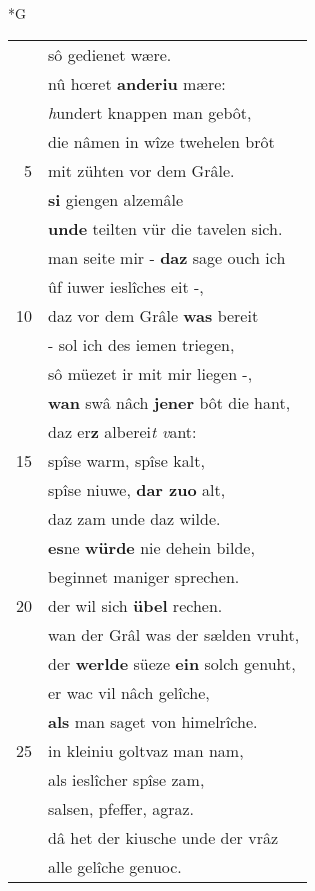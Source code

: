 \documentclass[8pt,a4paper,notitlepage]{article}
\begin{document}
\begin{table}[ht]
\begin{minipage}[t]{0.5\linewidth}
\small
\begin{center}*G
\end{center}
\begin{tabular}{rl}
 & sô gedienet wære.\\ 
 & nû hœret \textbf{anderiu} mære:\\ 
 & \textit{h}undert knappen man gebôt,\\ 
 & die nâmen in wîze twehelen brôt\\ 
5 & mit zühten vor dem Grâle.\\ 
 & \textbf{si} giengen alzemâle\\ 
 & \textbf{unde} teilten vür die tavelen sich.\\ 
 & man seite mir - \textbf{daz} sage ouch ich\\ 
 & ûf iuwer ieslîches eit -,\\ 
10 & daz vor dem Grâle \textbf{was} bereit\\ 
 & - sol ich des iemen triegen,\\ 
 & sô müezet ir mit mir liegen -,\\ 
 & \textbf{wan} swâ nâch \textbf{jener} bôt die hant,\\ 
 & daz er\textbf{z} alberei\textit{t v}ant:\\ 
15 & spîse warm, spîse kalt,\\ 
 & spîse niuwe, \textbf{dar zuo} alt,\\ 
 & daz zam unde daz wilde.\\ 
 & \textbf{es}ne \textbf{würde} nie dehein bilde,\\ 
 & beginnet maniger sprechen.\\ 
20 & der wil sich \textbf{übel} rechen.\\ 
 & wan der Grâl was der sælden vruht,\\ 
 & der \textbf{werlde} süeze \textbf{ein} solch genuht,\\ 
 & er wac vil nâch gelîche,\\ 
 & \textbf{als} man saget von himelrîche.\\ 
25 & in kleiniu goltvaz man nam,\\ 
 & als ieslîcher spîse zam,\\ 
 & salsen, pfeffer, agraz.\\ 
 & dâ het der kiusche unde der vrâz\\ 
 & alle gelîche genuoc.\\ 

\end{tabular}
\end{minipage}
\end{table}
\end{document}

